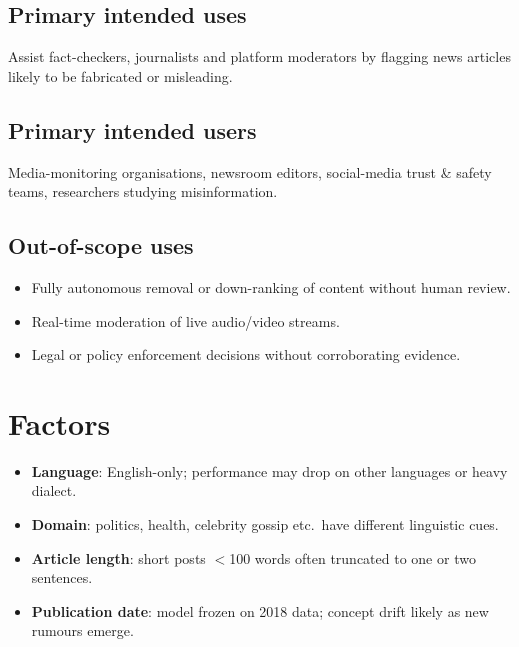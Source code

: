 \documentclass[11pt]{article}
\begin{document}
\subsection*{Primary intended uses}

Assist fact-checkers, journalists and platform moderators by flagging news articles likely to be fabricated or misleading.

  

\subsection*{Primary intended users}

Media-monitoring organisations, newsroom editors, social-media trust \& safety teams, researchers studying misinformation.

  

\subsection*{Out-of-scope uses}

\begin{itemize}[leftmargin=*, label=--]

\item Fully autonomous removal or down-ranking of content without human review.

\item Real-time moderation of live audio/video streams.

\item Legal or policy enforcement decisions without corroborating evidence.

\end{itemize}

  


\section{Factors}

\begin{itemize}[leftmargin=*, label=--]

\item \textbf{Language}: English-only; performance may drop on other languages or heavy dialect.

\item \textbf{Domain}: politics, health, celebrity gossip etc.~have different linguistic cues.

\item \textbf{Article length}: short posts $<$100 words often truncated to one or two sentences.

\item \textbf{Publication date}: model frozen on 2018 data; concept drift likely as new rumours emerge.

\end{itemize}
\end{document}
